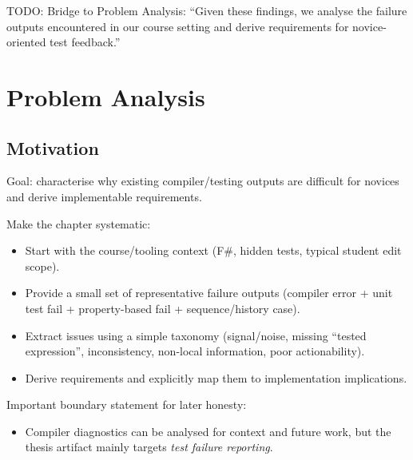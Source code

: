 \documentclass[
	bibliography=totoc,
	listof=totoc,
]{scrbook}
\begin{document}
\begin{marker}\begin{justify}
TODO: Bridge to Problem Analysis: ``Given these findings, we analyse the failure outputs encountered in our course setting and derive requirements for novice-oriented test feedback.''
\end{justify}\end{marker}


\pagebreak %
\chapter{Problem Analysis} %
\section*{Motivation} %

\begin{justify}
Goal: characterise why existing compiler/testing outputs are difficult for novices and derive implementable requirements.

Make the chapter systematic:
\begin{itemize}
    \item Start with the course/tooling context (F\#, hidden tests, typical student edit scope).
    \item Provide a small set of representative failure outputs (compiler error + unit test fail + property-based fail + sequence/history case).
    \item Extract issues using a simple taxonomy (signal/noise, missing ``tested expression'', inconsistency, non-local information, poor actionability).
    \item Derive requirements and explicitly map them to implementation implications.
\end{itemize}

Important boundary statement for later honesty:
\begin{itemize}
    \item Compiler diagnostics can be analysed for context and future work, but the thesis artifact mainly targets \emph{test failure reporting}.
\end{itemize}
\end{justify}
\end{document}
